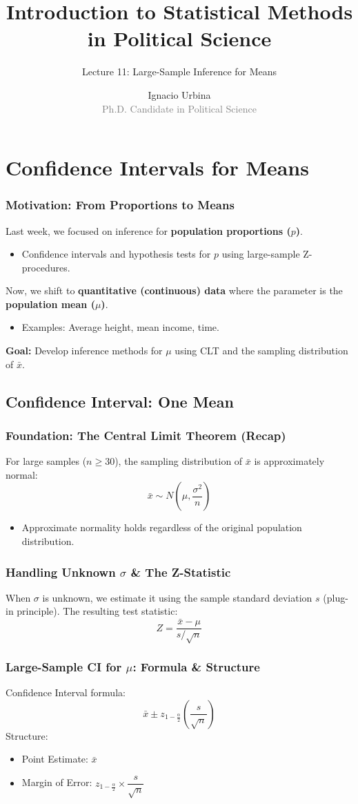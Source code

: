 \documentclass[handout]{beamer}
\title{Introduction to Statistical Methods in Political Science}
\subtitle{Lecture 11: Large-Sample Inference for Means}
\author{Ignacio Urbina \texorpdfstring{\\ \vspace{0.3em}}{ } \scriptsize \textcolor{gray}{Ph.D. Candidate in Political Science}}
\date{}
\begin{document}
\frame{\titlepage}

\section{Confidence Intervals for Means}



\begin{frame}
\frametitle{Motivation: From Proportions to Means}
Last week, we focused on inference for \textbf{population proportions ($p$)}.
\begin{itemize}
\item Confidence intervals and hypothesis tests for $p$ using large-sample Z-procedures.
\end{itemize}
Now, we shift to \textbf{quantitative (continuous) data} where the parameter is the \textbf{population mean ($\mu$)}.
\begin{itemize}
\item Examples: Average height, mean income, time.
\end{itemize}
\textbf{Goal:} Develop inference methods for $\mu$ using CLT and the sampling distribution of $\bar{x}$.
\end{frame}

\subsection{Confidence Interval: One Mean}

\begin{frame}
\frametitle{Foundation: The Central Limit Theorem (Recap)}
For large samples ($n \ge 30$), the sampling distribution of $\bar{x}$ is approximately normal:
\[ \bar{x} \sim N\left(\mu, \frac{\sigma^2}{n}\right) \]
\begin{itemize}
\item Approximate normality holds regardless of the original population distribution.
\end{itemize}
\end{frame}

\begin{frame}
\frametitle{Handling Unknown $\sigma$ \& The Z-Statistic}
When $\sigma$ is unknown, we estimate it using the sample standard deviation $s$ (plug-in principle).
The resulting test statistic:
\[ Z = \frac{\bar{x} - \mu}{s/\sqrt{n}} \]
\end{frame}

\begin{frame}
\frametitle{Large-Sample CI for $\mu$: Formula \& Structure}
Confidence Interval formula:
\[ \bar{x} \pm z_{1-\frac{\alpha}{2}} \left(\frac{s}{\sqrt{n}}\right) \]
Structure:
\begin{itemize}
\item Point Estimate: $\bar{x}$
\item Margin of Error: $z_{1-\frac{\alpha}{2}} \times \dfrac{s}{\sqrt{n}}$
\end{itemize}
\end{frame}
\end{document}
